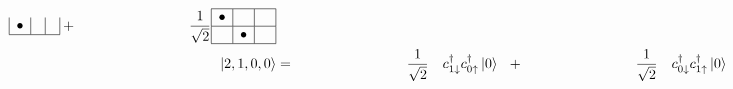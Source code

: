 \begin{frame}[t]
\begin{align*}
\begin{array}{|c|c|c|}
  \bullet &  &  \\
  \hline
  \end{array} + \qquad \qquad \qquad \qquad
  \frac{1}{\sqrt{2}}
  \begin{array}{|c|c|c|}
  \hline
  \bullet & \phantom{\bullet} & \phantom{\bullet} \\ \hline
  & \bullet &  \\
  \hline
  \end{array} \\
  \Ket{2,1,0,0} & = \qquad \qquad \qquad \qquad
  \frac{1}{\sqrt{2}} \ \ \ c_{1\downarrow}^\dagger c_{0\uparrow}^\dagger \Ket{0} \ \
  + \qquad \qquad \qquad \qquad
  \frac{1}{\sqrt{2}} \ \ \ c_{0\downarrow}^\dagger c_{1\uparrow}^\dagger \Ket{0}
  \end{align*}
\end{frame}
